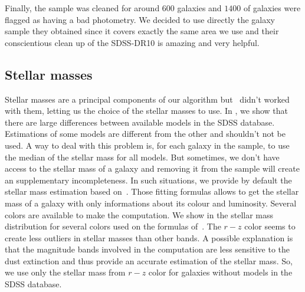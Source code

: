 Finally, the sample was cleaned for around $600$ galaxies and $1400$ of
galaxies were flagged as having a bad photometry. We decided to use directly
the galaxy sample they obtained since it covers exactly the same area we use
and their conscientious clean up of the SDSS-DR10 is amazing and very helpful.

\subsection{Stellar masses}
\label{sub:stellar_masses}

Stellar masses are a principal components of our algorithm
but~\cite{Tempel+14} didn't worked with them, letting us the choice of the
stellar masses to use. In , we show that
there are large differences between available models in the SDSS database.
Estimations of some models are different from the other and shouldn't not be
used. A way to deal with this problem is, for each galaxy in the sample, to
use the median of the stellar mass for all models. But sometimes, we don't
have access to the stellar mass of a galaxy and removing it from the sample
will create an supplementary incompleteness. In such situations, we provide
by default the stellar mass estimation based on~\cite{Bell+03}. Those
fitting formulas allows to get the stellar mass of a galaxy with only
informations about its colour and luminosity. Several colors are available
to make the computation. We show in  the
stellar mass distribution for several colors used on the formulas
of~\cite{Bell+03}. The $r-z$ color seems to create less outliers in stellar
masses than other bands. A possible explanation is that the magnitude bands
involved in the computation are less sensitive to the dust extinction and
thus provide an accurate estimation of the stellar mass. So, we use only the
stellar mass from $r-z$ color for galaxies without models in the SDSS
database.

